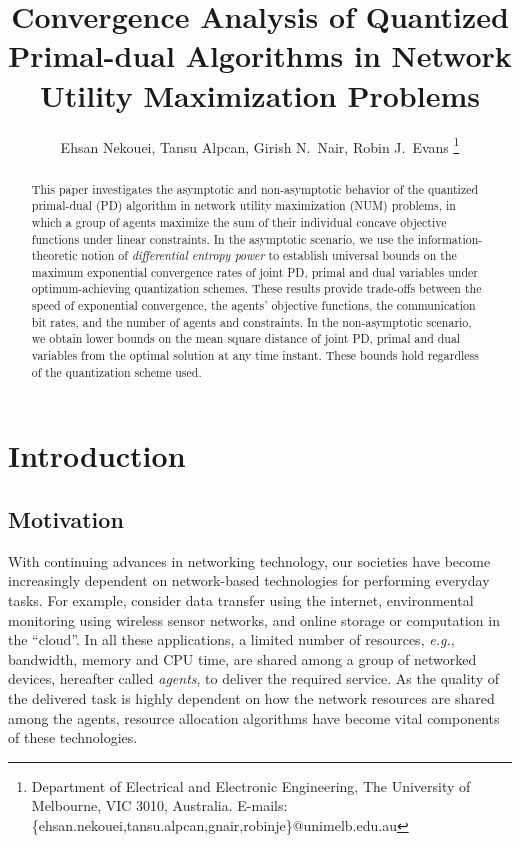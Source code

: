 \documentclass[10pt,twocolumn,twoside]{IEEEtran}
\begin{document}
\title{Convergence Analysis of Quantized Primal-dual Algorithms in Network Utility Maximization Problems}
\author{Ehsan Nekouei, Tansu Alpcan, Girish N.~Nair, Robin J.~Evans 
\thanks{Department of Electrical and Electronic Engineering, The University of Melbourne, VIC 3010, Australia. E-mails: \{ehsan.nekouei,tansu.alpcan,gnair,robinje\}@unimelb.edu.au }
}
\maketitle
\thispagestyle{empty}
\begin{abstract}
This paper investigates the asymptotic and non-asymptotic behavior of the quantized primal-dual (PD) algorithm in network utility maximization (NUM) problems,
in which a group of agents  maximize the sum of their individual concave objective functions under linear constraints. 
 In the asymptotic scenario, we 
use the information-theoretic notion of {\em differential entropy power} to establish universal bounds on the maximum exponential convergence rates of joint PD, primal and dual variables under optimum-achieving quantization schemes. These results provide trade-offs between the speed of exponential convergence, the agents' objective functions, the communication bit rates, and the number of agents and constraints. In the non-asymptotic scenario, we obtain lower bounds on the mean square distance of joint PD, primal and dual variables from the optimal solution at any time instant. These bounds hold regardless of the quantization scheme used.
\end{abstract}
\begin{IEEEkeywords}
\end{IEEEkeywords}

\section{Introduction}
\subsection{Motivation}
With continuing advances in  networking technology, our societies have become increasingly dependent on network-based technologies for performing everyday tasks. 
For example, consider data transfer using the internet, environmental monitoring  using wireless sensor networks, and online storage or computation in the ``cloud''. 
In all these applications, a limited number of resources, \emph{e.g.}, bandwidth, memory and CPU time, are shared among a group of networked devices, hereafter called \emph{agents}, 
to deliver the required service. As the quality of the delivered task is highly dependent on how the network resources are shared among the agents, 
resource allocation algorithms have become  vital components of these technologies. 
\end{document}
